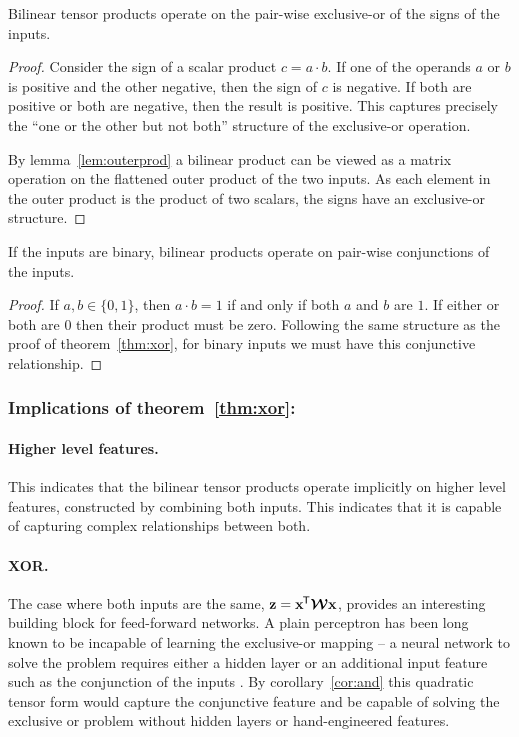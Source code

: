 \begin{thm}  \label{thm:xor}
Bilinear tensor products operate on the pair-wise exclusive-or of the
signs of the inputs.
\end{thm}
\begin{proof}
Consider the sign of a scalar product
\(c = a\cdot b\). If one of the operands \(a\) or \(b\) is positive and the other negative,
then the sign of \(c\) is negative. If both are positive or both are negative, then the
result is positive. This captures precisely the ``one or the other but not both'' structure
of the exclusive-or operation.

By lemma~\ref{lem:outerprod} a bilinear product can be viewed as a matrix operation on the flattened
outer product of the two inputs. As each element in the outer product is the product of two scalars,
the signs have an exclusive-or structure.
\end{proof}

\begin{cor}\label{cor:and}
If the inputs are binary, bilinear products operate on pair-wise conjunctions of the inputs.
\end{cor}
\begin{proof}
If \(a, b \in \{0, 1\}\), then \(a \cdot b = 1\) if and only if both \(a\) and \(b\) are \(1\). If
either or both are \(0\) then their product must be zero. Following the same structure as the proof
of theorem~\ref{thm:xor}, for binary inputs we must have this conjunctive relationship.
\end{proof}

\subsubsection{Implications of theorem~\ref{thm:xor}:}
\paragraph{Higher level features.}
This indicates that the bilinear tensor products operate implicitly on higher
level features, constructed by combining both inputs. This indicates that it is capable of capturing
complex relationships between both.
\paragraph{XOR.}
The case where both inputs are the same, \(\mathbf{z} = \mathbf{x}^{\mkern-1.5mu\mathsf{T}}\bm{\mathcal{W}}\mathbf{x}\),
provides an interesting building block for feed-forward networks. A plain perceptron has been 
long known to be incapable of learning the exclusive-or
mapping \autocite{Minsky1969} -- a neural network to solve the problem requires either a hidden layer
or an additional input feature such as the conjunction of the inputs \autocite{Rumelhart1986}.
By corollary~\ref{cor:and} this quadratic tensor form would capture the
conjunctive feature and be capable of solving the exclusive or problem without hidden
layers or hand-engineered features.
